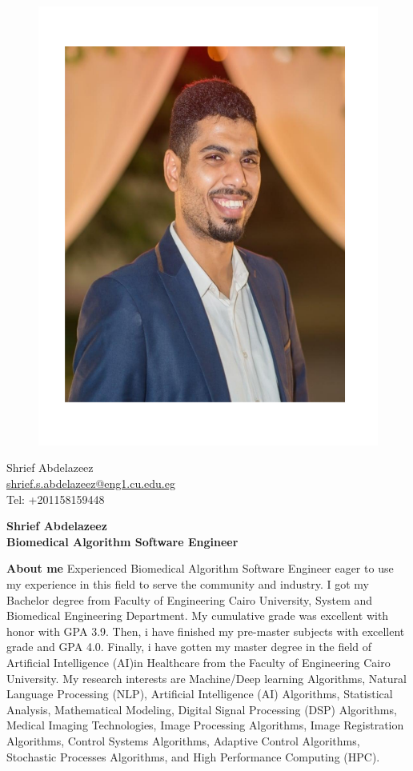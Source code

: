 \documentclass[a4paper,12pt,final]{memoir}
\newcommand{\Sep}{\vspace{1.5em}}
\newenvironment{AboutMe}
	{\ignorespaces\textbf{\color{RoyalBlue} About me}}
	{\Sep\ignorespacesafterend}
\begin{document}
\begin{figure}
	\hfill
	\includegraphics[width=0.6\columnwidth]{photo.pdf}
	\vspace{-7cm}
\end{figure}

\begin{flushright}\Small
	Shrief Abdelazeez \\
	\url{shrief.s.abdelazeez@eng1.cu.edu.eg}  \\
     Tel: +201158159448
\end{flushright}\normalsize
\framebreak


\Huge\bfseries {\color{RoyalBlue} Shrief Abdelazeez} \\
\Large\bfseries  Biomedical Algorithm Software Engineer \\

\normalsize\normalfont

\begin{AboutMe}
Experienced Biomedical Algorithm Software Engineer eager to use my experience in this field to serve the community and industry. I got my Bachelor degree from Faculty of Engineering Cairo University, System and Biomedical Engineering Department. My cumulative grade was excellent with honor with GPA 3.9. Then, i have finished my pre-master subjects with excellent grade and GPA 4.0. Finally, i have gotten my master degree in the field of Artificial Intelligence (AI)in Healthcare from the Faculty of Engineering Cairo University. My research interests are Machine/Deep learning Algorithms, Natural Language Processing (NLP), Artificial Intelligence (AI) Algorithms, Statistical Analysis, Mathematical Modeling, Digital Signal Processing (DSP) Algorithms, Medical Imaging Technologies, Image Processing Algorithms, Image Registration Algorithms, Control Systems Algorithms, Adaptive Control Algorithms, Stochastic Processes Algorithms, and High Performance Computing (HPC).
\end{AboutMe}
\end{document}
